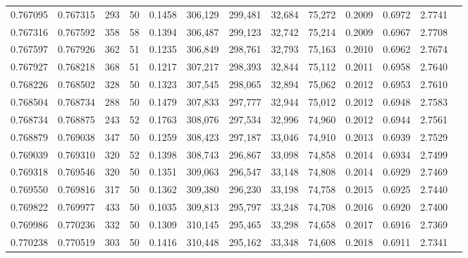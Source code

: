 \begin{tabular}{rrrrrrrrrrrrr}
0.767095 & 0.767315 &   293 &  50 &                                     0.1458 & 306,129 & 299,481 &  32,684 &  75,272 & 0.2009 & 0.6972 & 2.7741 \\
0.767316 & 0.767592 &   358 &  58 &                                     0.1394 & 306,487 & 299,123 &  32,742 &  75,214 & 0.2009 & 0.6967 & 2.7708 \\
0.767597 & 0.767926 &   362 &  51 &                                     0.1235 & 306,849 & 298,761 &  32,793 &  75,163 & 0.2010 & 0.6962 & 2.7674 \\
0.767927 & 0.768218 &   368 &  51 &                                     0.1217 & 307,217 & 298,393 &  32,844 &  75,112 & 0.2011 & 0.6958 & 2.7640 \\
0.768226 & 0.768502 &   328 &  50 &                                     0.1323 & 307,545 & 298,065 &  32,894 &  75,062 & 0.2012 & 0.6953 & 2.7610 \\
0.768504 & 0.768734 &   288 &  50 &                                     0.1479 & 307,833 & 297,777 &  32,944 &  75,012 & 0.2012 & 0.6948 & 2.7583 \\
0.768734 & 0.768875 &   243 &  52 &                                     0.1763 & 308,076 & 297,534 &  32,996 &  74,960 & 0.2012 & 0.6944 & 2.7561 \\
0.768879 & 0.769038 &   347 &  50 &                                     0.1259 & 308,423 & 297,187 &  33,046 &  74,910 & 0.2013 & 0.6939 & 2.7529 \\
0.769039 & 0.769310 &   320 &  52 &                                     0.1398 & 308,743 & 296,867 &  33,098 &  74,858 & 0.2014 & 0.6934 & 2.7499 \\
0.769318 & 0.769546 &   320 &  50 &                                     0.1351 & 309,063 & 296,547 &  33,148 &  74,808 & 0.2014 & 0.6929 & 2.7469 \\
0.769550 & 0.769816 &   317 &  50 &                                     0.1362 & 309,380 & 296,230 &  33,198 &  74,758 & 0.2015 & 0.6925 & 2.7440 \\
0.769822 & 0.769977 &   433 &  50 &                                     0.1035 & 309,813 & 295,797 &  33,248 &  74,708 & 0.2016 & 0.6920 & 2.7400 \\
0.769986 & 0.770236 &   332 &  50 &                                     0.1309 & 310,145 & 295,465 &  33,298 &  74,658 & 0.2017 & 0.6916 & 2.7369 \\
0.770238 & 0.770519 &   303 &  50 &                                     0.1416 & 310,448 & 295,162 &  33,348 &  74,608 & 0.2018 & 0.6911 & 2.7341 \\

\end{tabular}
